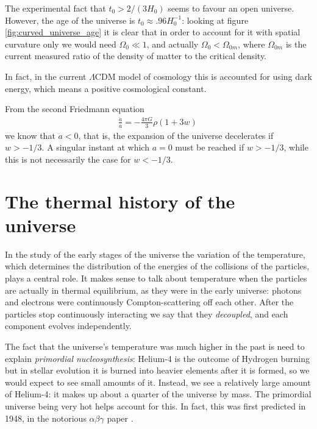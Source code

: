 \documentclass[main.tex]{subfiles}
\begin{document}
The experimental fact that \(t_0 > 2/(3H_0 )\) seems to favour an open universe. 
However, the age of the universe is \(t_0 \approx \num{.96} H_0^{-1}\): looking at figure \ref{fig:curved_universe_age} it is clear that in order to account for it with spatial curvature only we would need \(\Omega_0 \ll 1\), and actually \(\Omega_0 < \Omega_{0m}\), where \(\Omega_{0m}\) is the current measured ratio of the density of matter to the critical density. 

In fact, in the current \(\Lambda \)CDM model of cosmology this is accounted for using dark energy, which means a positive cosmological constant.

From the second Friedmann equation 
%
\begin{align}
\frac{\ddot{a}}{a} =- \frac{4 \pi G}{3} \rho (1+3w) 
\,
\end{align}
%
we know that \(\ddot{a} < 0\), that is, the expansion of the universe decelerates if \(w > - 1/3\).
A singular instant at which \(a =0\) must be reached if \(w>-1/3\), while this is not necessarily the case for \(w<-1/3\).


\chapter{The thermal history of the universe}

In the study of the early stages of the universe the variation of the temperature, which determines the distribution of the energies of the collisions of the particles, plays a central role.
It makes sense to talk about temperature when the particles are actually in thermal equilibrium, as they were in the early universe: photons and electrons were continuously Compton-scattering off each other. 
After the particles stop continuously interacting we say that they \emph{decoupled}, and each component evolves independently. 

The fact that the universe's temperature was much higher in the past is need to explain \emph{primordial nucleosynthesis}: Helium-4 is the outcome of Hydrogen burning but in stellar evolution it is burned into heavier elements after it is formed, so we would expect to see small amounts of it. 
Instead, we see a relatively large amount of Helium-4: it makes up about a quarter of the universe by mass. 
The primordial universe being very hot helps account for this. 
In fact, this was first predicted in 1948, in the notorious \(\alpha \beta \gamma \) paper \cite[]{alpherOriginChemicalElements1948}. 
\end{document}
